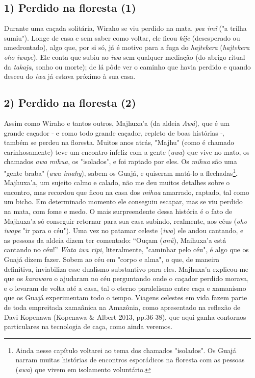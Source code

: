 \subsection{1) Perdido na floresta (1)}

Durante uma caçada solitária, Wiraho se viu perdido na mata, \emph{pea
imĩ} ("a trilha sumiu"). Longe de casa e sem saber como voltar, ele
ficou \emph{kije} (desesperado ou amedrontado), algo que, por si só, já
é motivo para a fuga do \emph{hajtekera} (\emph{hajtekera oho}
\emph{iwape}). Ele conta que subiu ao \emph{iwa} sem qualquer mediação
(do abrigo ritual da \emph{takaja}, sonho ou morte); de lá pôde ver o
caminho que havia perdido e quando desceu do \emph{iwa} já estava
próximo à sua casa.

\subsection{2) Perdido na floresta (2)}

Assim como Wiraho e tantos outros, Majhuxa'a (da aldeia \emph{Awá}), que
é um grande caçador - e como todo grande caçador, repleto de boas
histórias -, também se perdeu na floresta. Muitos anos atrás, "Majhu"
(como é chamado carinhosamente) teve um encontro infeliz com a gente
(\emph{awa}) que vive no mato, os chamados \emph{awa mihua}, os
"isolados", e foi raptado por eles. Os \emph{mihua} são uma "gente
braba" (\emph{awa imahy}), sabem os Guajá, e quiseram matá-lo a
flechadas\footnote{Ainda nesse capítulo voltarei ao tema dos chamados
  "isolados". Os Guajá narram muitas histórias de encontros esporádicos
  na floresta com as pessoas (\emph{awa}) que vivem em isolamento
  voluntário.}. Majhuxa'a, um sujeito calmo e calado, não me deu muitos
detalhes sobre o encontro, mas recordou que ficou na casa dos
\emph{mihua} amarrado, raptado, tal como um bicho. Em determinado
momento ele conseguiu escapar, mas se viu perdido na mata, com fome e
medo. O mais surpreendente dessa história é o fato de Majhuxa'a só
conseguir retornar para sua casa subindo, realmente, aos céus (\emph{oho
iwape} "ir para o céu"). Uma vez no patamar celeste (\emph{iwa}) ele
andou cantando, e as pessoas da aldeia dizem ter comentado: ``Ouçam
(\emph{anũ}), Maihuxa'a está cantando no céu!'' \emph{Wata iwa ripi},
literalmente, "caminhar pelo céu", é algo que os Guajá dizem fazer.
Sobem ao céu em "corpo e alma", o que, de maneira definitiva,
inviabiliza esse dualismo substantivo para eles. Majhuxa'a explicou-me
que os \emph{karawara} o ajudaram no céu perguntando onde o caçador
perdido morava, e o levaram de volta até a casa, tal o eterno
paralelismo entre caça e xamanismo que os Guajá experimentam todo o
tempo. Viagens celestes em vida fazem parte de toda empreitada xamaânica
na Amazônia, como apresentado na reflexão de Davi Kopenawa (Kopenawa \&
Albert 2013, pp.36-38), que aqui ganha contornos particulares na
tecnologia de caça, como ainda veremos.

